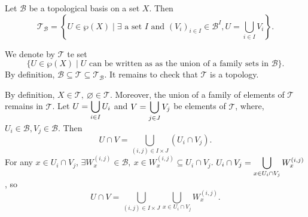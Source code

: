 \begin{propositionenv}
    Let $\mathcal{B}$ be a topological basis on a set $X$. Then
    $$\mathscr{T}_{\mathcal{B}}=\left\{U\in\wp(X)\mid \exists \text{ a set }I \text{ and }(V_i)_{i\in I}\in \mathcal{B}^I, U=\bigcup_{i\in I}V_i\right\}.$$
\end{propositionenv}
\begin{proofenv}
    We denote by $\mathscr{T}$ te set 
    $$\{U\in \wp(X)\mid U\text{ can be written as as the union of a family sets in }\mathcal{B}\}.$$
    By definition, $\mathcal{B}\subseteq\mathscr{T}\subseteq\mathscr{T}_{\mathcal{B}}$. It remains to check that $\mathscr{T}$ is a topology.

    By definition, $X\in \mathscr{T},\ \varnothing\in \mathscr{T}$. Moreover, the union of a family of elements of $\mathscr{T}$ remains in $\mathscr{T}$. Let $\displaystyle U=\bigcup_{i\in I}U_i$ and $\displaystyle V=\bigcup_{j\in J}V_j$ be elements of $\mathscr{T}$, where, $U_i\in\mathcal{B}, V_{j}\in \mathcal{B}$. Then 
    $$ U\cap V=\bigcup_{(i,j)\in I\times J}\left(U_i\cap V_{j}\right).$$
    For any $x\in U_i\cap V_j$, $\exists W_x^{(i,j)}\in \mathcal{B},\ x\in W_x^{(i,j)}\subseteq U_i\cap V_j$. $\displaystyle U_i\cap V_j=\bigcup_{x\in U_i\cap V_j}W_x^{(i,j)}$, so 
    $$U\cap V=\bigcup_{(i,j)\in I\times J}\bigcup_{x\in U_i\cap V_j}W_x^{(i,j)}.$$
\end{proofenv}


